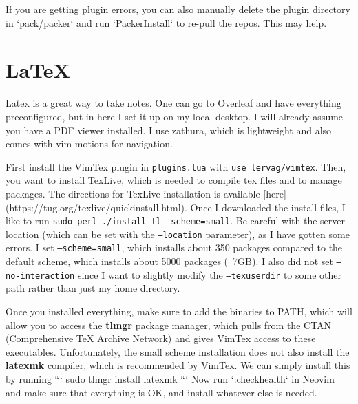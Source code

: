 \documentclass{article}
\begin{document}
    If you are getting plugin errors, you can also manually delete the plugin directory in `pack/packer` and run `PackerInstall` to re-pull the repos. This may help. 

\section{LaTeX} 

  Latex is a great way to take notes. One can go to Overleaf and have everything preconfigured, but in here I set it up on my local desktop. I will already assume you have a PDF viewer installed. I use zathura, which is lightweight and also comes with vim motions for navigation. 

  First install the VimTex plugin in \texttt{plugins.lua} with \texttt{use lervag/vimtex}. Then, you want to install TexLive, which is needed to compile tex files and to manage packages. The directions for TexLive installation is available [here](https://tug.org/texlive/quickinstall.html). Once I downloaded the install files, I like to run \texttt{sudo perl ./install-tl --scheme=small}. Be careful with the server location (which can be set with the \texttt{--location} parameter), as I have gotten some errors. I set \texttt{--scheme=small}, which installs about 350 packages compared to the default scheme, which installs about 5000 packages (~7GB). I also did not set \texttt{--no-interaction} since I want to slightly modify the \texttt{--texuserdir} to some other path rather than just my home directory. 

  Once you installed everything, make sure to add the binaries to PATH, which will allow you to access the \textbf{tlmgr} package manager, which pulls from the CTAN (Comprehensive TeX Archive Network) and gives VimTex access to these executables. Unfortunately, the small scheme installation does not also install the \textbf{latexmk} compiler, which is recommended by VimTex. We can simply install this by running 
  ```
  sudo tlmgr install latexmk
  ```
  Now run `:checkhealth` in Neovim and make sure that everything is OK, and install whatever else is needed. 
\end{document}
